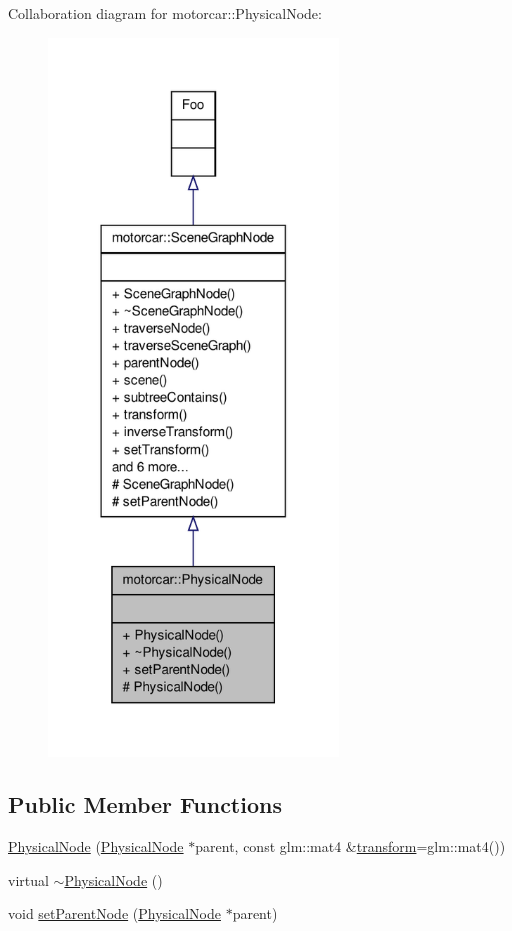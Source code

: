 Collaboration diagram for motorcar\-:\-:Physical\-Node\-:
\nopagebreak
\begin{figure}[H]
\begin{center}
\leavevmode
\includegraphics[width=218pt]{classmotorcar_1_1PhysicalNode__coll__graph}
\end{center}
\end{figure}
\subsection*{Public Member Functions}
\begin{DoxyCompactItemize}
\item 
\hyperlink{classmotorcar_1_1PhysicalNode_a91ba5f3ead25d072f128375369b75fe0}{Physical\-Node} (\hyperlink{classmotorcar_1_1PhysicalNode}{Physical\-Node} $\ast$parent, const glm\-::mat4 \&\hyperlink{classmotorcar_1_1SceneGraphNode_ad96e79fdd739ac8223a3128003be391a}{transform}=glm\-::mat4())
\item 
virtual \hyperlink{classmotorcar_1_1PhysicalNode_aa132dbe84a01971eb4e149852a1b52f1}{$\sim$\-Physical\-Node} ()
\item 
void \hyperlink{classmotorcar_1_1PhysicalNode_aadcd6c81c0f8b2f57e6bebe9100d0690}{set\-Parent\-Node} (\hyperlink{classmotorcar_1_1PhysicalNode}{Physical\-Node} $\ast$parent)
\end{DoxyCompactItemize}
